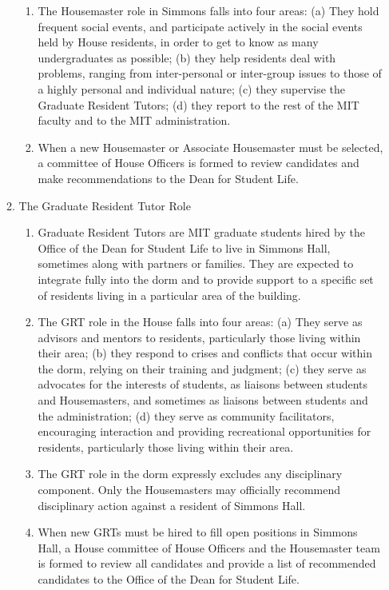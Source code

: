 \documentclass[letterpaper]{article}
\begin{document}
\begin{enumerate}
\begin{enumerate}
\begin{enumerate}
\item The Housemaster role in Simmons falls into four areas: (a) They hold frequent social events, and participate actively in the social events held by House residents, in order to get to know as many undergraduates as possible; (b) they help residents deal with problems, ranging from inter-personal or inter-group issues to those of a highly personal and individual nature; (c) they supervise the Graduate Resident Tutors; (d) they report to the rest of the MIT faculty and to the MIT administration.

\item When a new Housemaster or Associate Housemaster must be selected, a committee of House Officers is formed to review candidates and make recommendations to the Dean for Student Life.

\end{enumerate}

\item The Graduate Resident Tutor Role

\begin{enumerate}

\item Graduate Resident Tutors are MIT graduate students hired by the Office of the Dean for Student Life to live in Simmons Hall, sometimes along with partners or families. They are expected to integrate fully into the dorm and to provide support to a specific set of residents living in a particular area of the building.

\item The GRT role in the House falls into four areas: (a) They serve as advisors and mentors to residents, particularly those living within their area; (b) they respond to crises and conflicts that occur within the dorm, relying on their training and judgment; (c) they serve as advocates for the interests of students, as liaisons between students and Housemasters, and sometimes as liaisons between students and the administration; (d) they serve as community facilitators, encouraging interaction and providing recreational opportunities for residents, particularly those living within their area.

\item The GRT role in the dorm expressly excludes any disciplinary component. Only the Housemasters may officially recommend disciplinary action against a resident of Simmons Hall.

\item When new GRTs must be hired to fill open positions in Simmons Hall, a House committee of House Officers and the Housemaster team is formed to review all candidates and provide a list of recommended candidates to the Office of the Dean for Student Life.


\end{enumerate}
\end{enumerate}
\end{enumerate}
\end{document}
